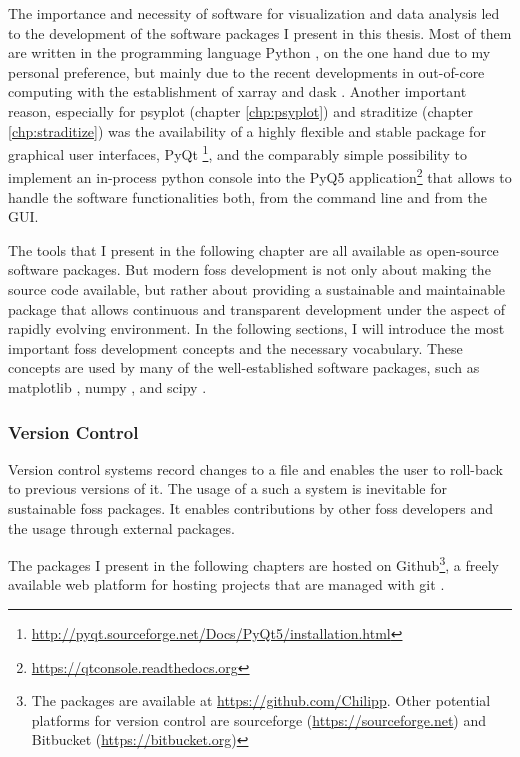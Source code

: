 \documentclass[
11pt, %
english, %
singlespacing, %
headsepline, %
]{MastersDoctoralThesis} %
\begin{document}
\begin{NoHyper}
\begin{refsection}
The importance and necessity of software for visualization and data analysis led to the development of the software packages I present in this thesis. Most of them are written in the programming language Python \citep{PerezGrangerHunter2011}, on the one hand due to my personal preference, but mainly due to the recent developments in out-of-core computing with the establishment of xarray and dask \citep{HoyerHamman2017, DDT2016, Rocklin2015}. Another important reason, especially for psyplot (chapter \ref{chp:psyplot}) and straditize (chapter \ref{chp:straditize}) was the availability of a highly flexible and stable package for graphical user interfaces, PyQt \footnote{\url{http://pyqt.sourceforge.net/Docs/PyQt5/installation.html}}, and the comparably simple possibility to implement an in-process python console into the PyQ5 application\footnote{\url{https://qtconsole.readthedocs.org}} that allows to handle the software functionalities both, from the command line and from the GUI.

The tools that I present in the following chapter are all available as open-source software packages. But modern \gls{foss} development is not only about making the source code available, but rather about providing a sustainable and maintainable package that allows continuous and transparent development under the aspect of rapidly evolving environment. In the following sections, I will introduce the most important \gls{foss} development concepts \citep[e.g.][]{StoddenMiguez2014, Shaw2018} and the necessary vocabulary. These concepts are used by many of the well-established software packages, such as matplotlib \citep{Hunter2007}, numpy \citep{Oliphant2006}, and scipy \citep{JonesOliphantPetersonEtAl2001}.

\subsubsection{Version Control} \label{sec:intro-software-github}
Version control systems record changes to a file and enables the user to roll-back to previous versions of it. The usage of a such a system is inevitable for sustainable \gls{foss} packages. It enables contributions by other \gls{foss} developers and the usage through external packages.

The packages I present in the following chapters are hosted on Github\footnote{The packages are available at \url{https://github.com/Chilipp}. Other potential platforms for version control are sourceforge (\url{https://sourceforge.net}) and Bitbucket (\url{https://bitbucket.org})}, a freely available web platform for hosting projects that are managed with git \citep{ChaconStraubPGC2019}.


\end{refsection}
\end{NoHyper}
\end{document}
